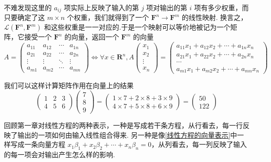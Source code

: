 不难发现这里的 $a_{ij}$ 项实际上反映了输入的第 $j$ 项对输出的第 $i$ 项有多少权重，而只要确定了这 $m\times n$ 个权重，我们就得到了一个 $\mathbf{F}^n\to\mathbf{F}^m$ 的线性映射. 换言之，$\mathcal{L}(\mathbf{F}^n, \mathbf{F}^m)$ 和这些权重是一一对应的.于是一个映射可以等价地被记为一个矩阵，它接受一个 $\mathbf{F}^n$ 的向量，返回一个 $\mathbf{F}^m$ 的向量
\[
    A = \begin{pmatrix}
        a_{11} & a_{12} & \cdots & a_{1n} \\
        a_{21} & a_{22} & \cdots & a_{2n} \\
        \vdots & \vdots & \ddots & \vdots \\
        a_{m1} & a_{m2} & \cdots & a_{mn}
    \end{pmatrix} \iff \forall x\in\mathbf{R}^n,
    A \begin{pmatrix}
        x_1 \\ x_2 \\ \vdots \\ x_n
    \end{pmatrix} = \begin{pmatrix}
        a_{11} x_1 + a_{12} x_2 + \cdots + a_{1n} x_n \\
        a_{21} x_1 + a_{22} x_2 + \cdots + a_{2n} x_n \\
        \cdots\\
        a_{m1} x_1 + a_{m2} x_2 + \cdots + a_{mn} x_n
    \end{pmatrix}
\]

我们可以这样计算矩阵作用在向量上的结果
\[
    \begin{pmatrix}
        1 & 2 & 3 \\ 4 & 5 & 6
    \end{pmatrix} \begin{pmatrix}
        7 \\ 8 \\ 9
    \end{pmatrix} = \begin{pmatrix}
        1\times 7 + 2\times 8 + 3\times 9 \\
        4 \times 7 + 5\times 8 + 6\times 9
    \end{pmatrix} = \begin{pmatrix}
        50 \\ 122
    \end{pmatrix}
\]

回顾第一章对线性方程的两种表示，一种是写成若干条方程，从行看去，每一行反映了输出的一项如何由输入线性组合得来. 另一种是像\autoref{线性方程的向量表示}中一样写成一条向量方程 $x_1\beta_1 + x_2\beta_2 + \cdots + x_n\beta_n = 0$，从列看去，每一列反映了输入的每一项会对输出产生怎么样的影响.

